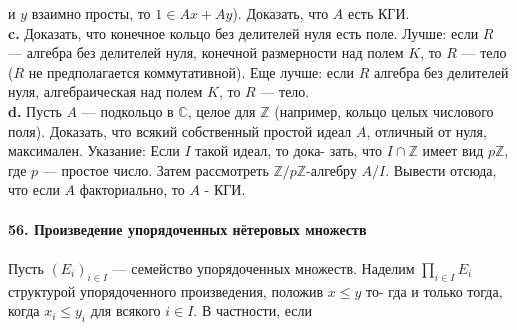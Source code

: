 \documentclass{mai_book}
\begin{document}
и $y$ взаимно просты, то $1\in Ax+Ay$). Доказать, что $A$ есть КГИ.
\\
\hspace*{10pt}\textbf{c.} Доказать, что конечное кольцо без делителей нуля есть поле.\linebreak
Лучше: если $R$ — алгебра без делителей нуля, конечной размерности\linebreak
над полем $K$, то $R$ — тело ($R$ не предполагается коммутативной). Еще\linebreak
лучше: если $R$ алгебра без делителей нуля, алгебраическая над полем\linebreak
$K$, то $R$ — тело.
\\
\hspace*{10pt}\textbf{d.} Пусть $A$ — подкольцо в $\mathbb{C}$, целое для $\mathbb{Z}$ (например, кольцо целых\linebreak
числового поля). Доказать, что всякий собственный простой идеал $A$,\linebreak
отличный от нуля, максимален. Указание: Если $I$ такой идеал, то дока-\linebreak
зать, что $I \cap\mathbb{Z}$ имеет вид $p\mathbb{Z}$, где $p$ — простое число. Затем рассмотреть\linebreak
$\mathbb{Z}/p\mathbb{Z}$-алгебру $A/I$. Вывести отсюда, что если $A$ факториально, то $A$ -\linebreak
КГИ.
\\
\\
\noindent\textbf{56. Произведение упорядоченных нётеровых множеств}\\\\
\hspace*{10pt} Пусть $(E_i)_{i\in I}$ — семейство упорядоченных множеств. Наделим\linebreak
$\prod_{i\in I} E_i$ структурой упорядоченного произведения, положив $x\leq y$ то-\linebreak
гда и только тогда, когда $x_i\leq y_i$ для всякого $i\in I$. В частности, если\linebreak\pagebreak

\end{document}
